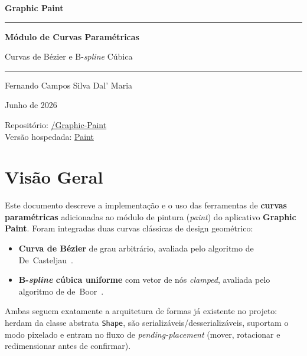 \documentclass[12pt, a4paper]{article}
\theoremstyle{remark}
\newcommand{\code}[1]{\texttt{#1}}
\begin{document}
\begin{titlepage}
    \centering
    \vspace*{3cm}
    {\LARGE\bfseries Graphic Paint \par}
    \vspace{2.5cm}
    \rule{\textwidth}{0.5pt}
    \vspace{0.5cm}
    {\Huge\bfseries Módulo de Curvas Paramétricas \par}
    \vspace{0.3cm}
    {\large Curvas de Bézier e B-\emph{spline} Cúbica \par}
    \vspace{0.5cm}
    \rule{\textwidth}{0.5pt}
    \vspace{2cm}
    {\large Fernando Campos Silva Dal' Maria \par}
    \vspace{0.5cm}
    {\normalsize Junho de 2026 \par}
    \vfill
    {\small
        Repositório: \href{https://github.com/FernandoCsm-Knight/Graphic-Paint}{/Graphic-Paint} \\[4pt]
        Versão hospedada: \href{https://graphic-paint-roan.vercel.app/paint}{Paint}
    }
\end{titlepage}

\tableofcontents
\newpage

\section{Visão Geral}

Este documento descreve a implementação e o uso das ferramentas de \textbf{curvas
paramétricas} adicionadas ao módulo de pintura (\emph{paint}) do aplicativo
\textbf{Graphic Paint}. Foram integradas duas curvas clássicas de design geométrico:

\begin{itemize}
    \item \textbf{Curva de Bézier} de grau arbitrário, avaliada pelo algoritmo
          de De~Casteljau~\cite{decasteljau1959}.
    \item \textbf{B-\emph{spline} cúbica uniforme} com vetor de nós
          \emph{clamped}, avaliada pelo algoritmo de de~Boor~\cite{deboor1972}.
\end{itemize}

Ambas seguem exatamente a arquitetura de formas já existente no projeto:
herdam da classe abstrata \code{Shape}, são serializ\-áveis/desserializáveis,
suportam o modo pixelado e entram no fluxo de \emph{pending-placement} (mover,
rotacionar e redimensionar antes de confirmar).
\end{document}
